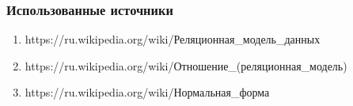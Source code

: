 \begin{frame}

\frametitle{Использованные источники}

\begin{enumerate}
\item https://ru.wikipedia.org/wiki/Реляционная\_модель\_данных
\item https://ru.wikipedia.org/wiki/Отношение\_(реляционная\_модель)
\item https://ru.wikipedia.org/wiki/Нормальная\_форма
\end{enumerate}

\end{frame}

